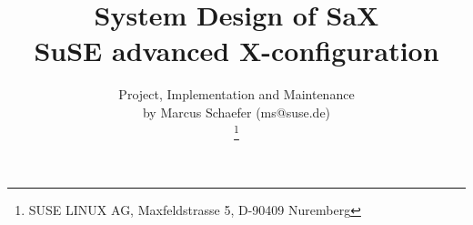 \documentclass[11pt, english, a4paper, headsepline, footsepline,
BCOR1.5cm, DIV16, bigheadings, bibtotoc, idxtotoc, headinclude,
footexclude, abstracton]{scrbook}
\title{
  System Design of SaX\\
  SuSE advanced X-configuration
}
\author{
  Project, Implementation and Maintenance\\ 
  by Marcus Schaefer (ms@suse.de)\\
  \thanks{
  SUSE LINUX AG, Maxfeldstrasse 5, D-90409 Nuremberg
  }
}
\date{
 \vspace{1cm}
 \epsfig{
   file=figures/logo.ps,width=4cm
 }\\
 \vspace{1.5cm}
 \vspace{3cm}
 \begin{tabbing}
  \hspace{2.6cm} Author: \quad\= Marcus Schaefer\\
  \hspace{2.6cm} Datum:\>  \today\\
 \end{tabbing}
}
\begin{document}
\dominitoc

\newenvironment{Command}%
 {\begin{Sbox}\begin{large}\begin{minipage}}%
 {\end{minipage}\end{large}\end{Sbox}%
  \vspace{0.5cm}\shadowbox{\TheSbox}\vspace{0.5cm}}

\maketitle
\tableofcontents














\end{document}
